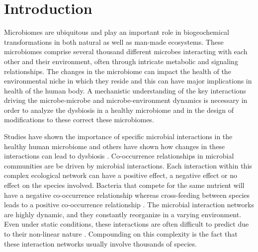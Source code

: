 
\section*{Introduction}

  Microbiomes are ubiquitous and play an important role in biogeochemical transformations in both natural as well as man-made ecosystems.
  These microbiomes comprise several thousand different microbes interacting with each other and their environment, often through intricate metabolic and signaling relationships.
  The changes in the microbiome can impact the health of the environmental niche in which they reside \cite{HumanMicrobiomeProjectConsortium2012,Lloyd-Price2016} and this can have major implications in health of the human body.
  A mechanistic understanding of the key interactions driving the microbe-microbe and microbe-environment dynamics is necessary in order to analyze the dysbiosis in a healthy microbiome and in the design of modifications to these correct these microbiomes.

  Studies have shown the importance of specific microbial interactions in the healthy human microbiome \cite{Lloyd-Price2016} and others have shown how changes in these interactions can lead to dysbiosis \cite{Wang2017,Gilbert2016,Belizario2015}.
  Co-occurrence relationships in microbial communities are be driven by microbial interactions.
  Each interaction within this complex ecological network can have a positive effect, a negative effect or no effect on the species involved.
  Bacteria that compete for the same nutrient will have a negative co-occurrence relationship \cite{Ghoul2016} whereas cross-feeding between species leads to a positive co-occurrence relationship \cite{DSouza2018}.
  The microbial interaction networks are highly dynamic, and they constantly reorganize in a varying environment.
  Even under static conditions, these interactions are often difficult to predict due to their non-linear nature \cite{Konopka2015}.
  Compounding on this complexity is the fact that these interaction networks usually involve thousands of species.

